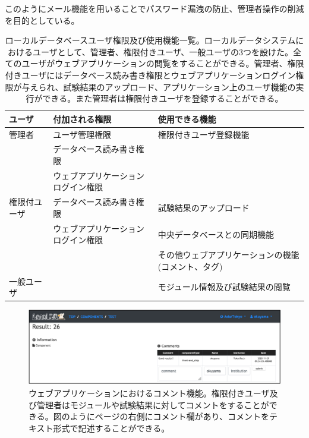このようにメール機能を用いることでパスワード漏洩の防止、管理者操作の削減を目的としている。

\clearpage
\begin{table}[btp]
\begin{center}
\caption[ローカルデータベースユーザ権限及び使用機能一覧]{ローカルデータベースユーザ権限及び使用機能一覧。ローカルデータシステムにおけるユーザとして、管理者、権限付きユーザ、一般ユーザの3つを設けた。全てのユーザがウェブアプリケーションの閲覧をすることができる。管理者、権限付きユーザにはデータベース読み書き権限とウェブアプリケーションログイン権限が与えられ、試験結果のアップロード、アプリケーション上のユーザ機能の実行ができる。また管理者は権限付きユーザを登録することができる。}
\label{user_functions_summary}
  \small
  \begin{tabular}{|lll|} \hline
    ユーザ       & 付加される権限                               & 使用できる機能 \\ \hline
    管理者       & ユーザ管理権限                     & 権限付きユーザ登録機能\\ 
                 & データベース読み書き権限           & \\ 
                 & ウェブアプリケーションログイン権限 & \\ \hline
    権限付ユーザ & データベース読み書き権限           & 試験結果のアップロード\\ 
                 & ウェブアプリケーションログイン権限 & 中央データベースとの同期機能\\ 
                 &                                    & その他ウェブアプリケーションの機能(コメント、タグ)\\ \hline
    一般ユーザ   &                                    & モジュール情報及び試験結果の閲覧　\\ \hline
  \end{tabular}
\end{center}
\end{table}

\begin{figure}[btp]\centering
\includegraphics[width=12cm]{./viewer_comment.png}
\caption[ウェブアプリケーションにおけるコメント機能]{ウェブアプリケーションにおけるコメント機能。権限付きユーザ及び管理者はモジュールや試験結果に対してコメントをすることができる。図のようにページの右側にコメント欄があり、コメントをテキスト形式で記述することができる。}
\label{webapp_comment}
\end{figure}

